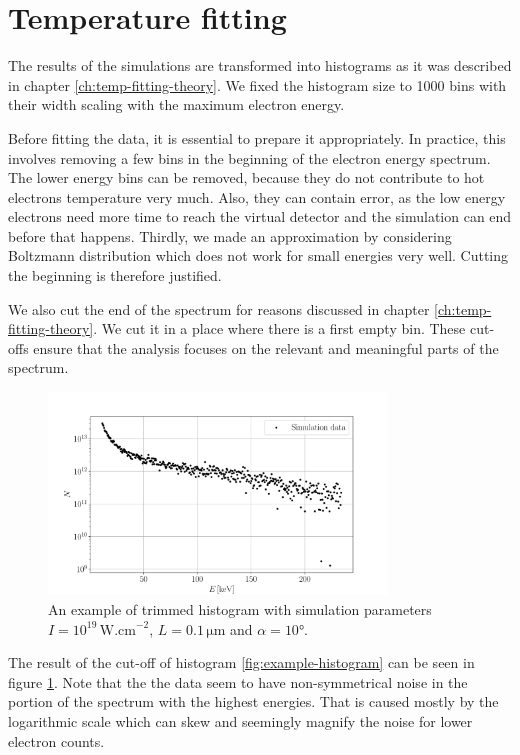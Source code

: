 \section{Temperature fitting}
The results of the simulations are transformed into histograms as it was described in chapter \ref{ch:temp-fitting-theory}. We fixed the histogram size to 1000 bins with their width scaling with the maximum electron energy.

Before fitting the data, it is essential to prepare it appropriately. In practice, this involves removing a few bins in the beginning of the electron energy spectrum. The lower energy bins can be removed, because they do not contribute to hot electrons temperature very much. Also, they can contain error, as the low energy electrons need more time to reach the virtual detector and the simulation can end before that happens. Thirdly, we made an approximation by considering Boltzmann distribution which does not work for small energies very well. Cutting the beginning is therefore justified. 

We also cut the end of the spectrum for reasons discussed in chapter \ref{ch:temp-fitting-theory}. We cut it in a place where there is a first empty bin. These cut-offs ensure that the analysis focuses on the relevant and meaningful parts of the spectrum.


\begin{figure}[h]
	\centering
	\includegraphics[width=0.8\textwidth]{figures/trimmed-hist}
	\caption{An example of trimmed histogram with simulation parameters $I=10^{19}\,\mathrm{W.cm}^{-2}$, $L=0.1\,\mathrm{\mu m}$ and $\alpha = 10$°.}
	\label{fig:trimmed-hist}
\end{figure}

The result of the cut-off of histogram \ref{fig:example-histogram} can be seen in figure \ref{fig:trimmed-hist}. Note that the the data seem to have non-symmetrical noise in the portion of the spectrum with the highest energies. That is caused mostly by the logarithmic scale which can skew and seemingly magnify the noise for lower electron counts. 


